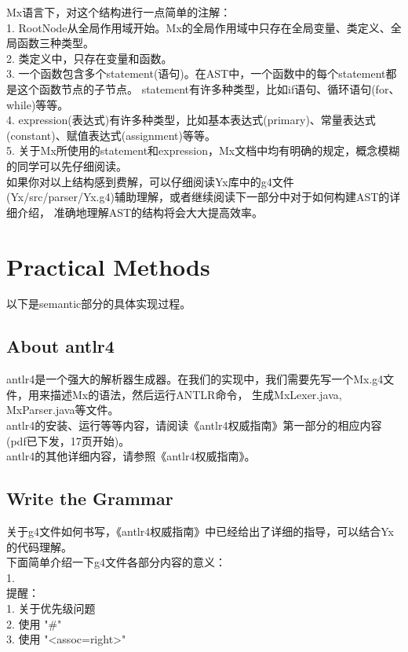 Mx语言下，对这个结构进行一点简单的注解：\\
1. RootNode从全局作用域开始。Mx的全局作用域中只存在全局变量、类定义、全局函数三种类型。\\
2. 类定义中，只存在变量和函数。 \\
3. 一个函数包含多个statement(语句)。在AST中，一个函数中的每个statement都是这个函数节点的子节点。
statement有许多种类型，比如if语句、循环语句(for、while)等等。\\
4. expression(表达式)有许多种类型，比如基本表达式(primary)、常量表达式(constant)、赋值表达式(assignment)等等。 \\
5. 关于Mx所使用的statement和expression，Mx文档中均有明确的规定，概念模糊的同学可以先仔细阅读。 \\

如果你对以上结构感到费解，可以仔细阅读Yx库中的g4文件(Yx/src/parser/Yx.g4)辅助理解，或者继续阅读下一部分中对于如何构建AST的详细介绍，
准确地理解AST的结构将会大大提高效率。\\

\section{Practical Methods}
以下是semantic部分的具体实现过程。

\subsection{About antlr4}
antlr4是一个强大的解析器生成器。在我们的实现中，我们需要先写一个Mx.g4文件，用来描述Mx的语法，然后运行ANTLR命令，
生成MxLexer.java, MxParser.java等文件。\\

antlr4的安装、运行等等内容，请阅读《antlr4权威指南》第一部分的相应内容(pdf已下发，17页开始)。\\

antlr4的其他详细内容，请参照《antlr4权威指南》。

\subsection{Write the Grammar}
关于g4文件如何书写，《antlr4权威指南》中已经给出了详细的指导，可以结合Yx的代码理解。\\

下面简单介绍一下g4文件各部分内容的意义：\\
1. \\

提醒： \\
1. 关于优先级问题 \\
2. 使用 "\#"  \\
3. 使用 "<assoc=right>"


